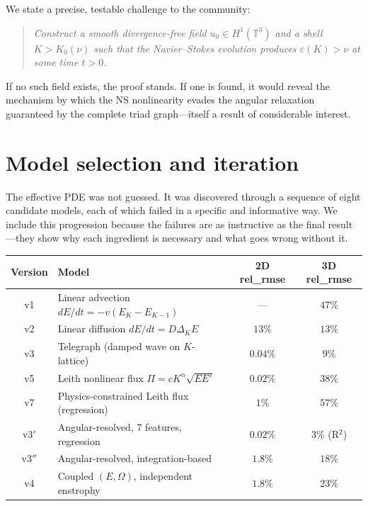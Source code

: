 \documentclass[11pt,a4paper]{article}
\theoremstyle{remark}
\newcommand{\T}{\mathbb{T}}
\begin{document}
We state a precise, testable challenge to the community:

\begin{quote}
\emph{Construct a smooth divergence-free field $u_0 \in H^1(\T^3)$ and a shell $K > K_0(\nu)$ such that the Navier--Stokes evolution produces $\varepsilon(K) > \nu$ at some time $t > 0$.}
\end{quote}

If no such field exists, the proof stands.  If one is found, it would reveal the mechanism by which the NS nonlinearity evades the angular relaxation guaranteed by the complete triad graph---itself a result of considerable interest.

\section{Model selection and iteration}\label{sec:model-selection}

The effective PDE was not guessed.  It was discovered through a sequence of eight candidate models, each of which failed in a specific and informative way.  We include this progression because the failures are as instructive as the final result---they show why each ingredient is necessary and what goes wrong without it.

\begin{center}
\begin{tabular}{clcc}
\toprule
Version & Model & 2D rel\_rmse & 3D rel\_rmse \\
\midrule
v1 & Linear advection $dE/dt = -v(E_K - E_{K-1})$ & --- & $47\%$ \\
v2 & Linear diffusion $dE/dt = D\Delta_K E$ & $13\%$ & $13\%$ \\
v3 & Telegraph (damped wave on $K$-lattice) & $0.04\%$ & $9\%$ \\
v5 & Leith nonlinear flux $\Pi = c K^\alpha\sqrt{EE'}$ & $0.02\%$ & $38\%$ \\
v7 & Physics-constrained Leith flux (regression) & $1\%$ & $57\%$ \\
v3$'$ & Angular-resolved, 7 features, regression & $0.02\%$ & $3\%$ (R$^2$) \\
v3$''$ & Angular-resolved, integration-based & $1.8\%$ & $18\%$ \\
v4 & Coupled $(E, \Omega)$, independent enstrophy & $1.8\%$ & $23\%$ \\
\bottomrule
\end{tabular}
\end{center}
\end{document}
